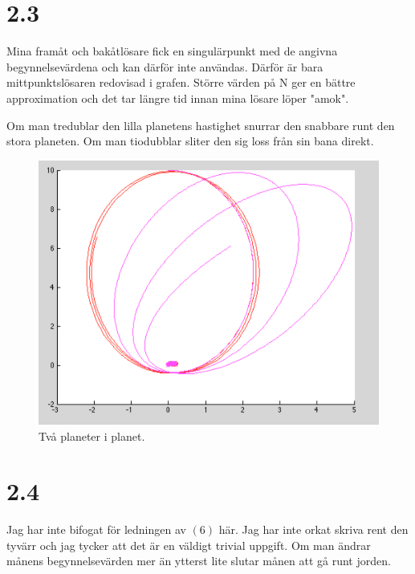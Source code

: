 \documentclass[a4paper,10pt]{article}
\begin{document}
    \section*{2.3}
    Mina framåt och bakåtlösare fick en singulärpunkt med de angivna begynnelsevärdena och kan därför inte användas. Därför är bara mittpunktslösaren redovisad i grafen. Större värden på N ger en bättre approximation och det tar längre tid innan mina lösare löper "amok".

    Om man tredublar den lilla planetens hastighet snurrar den snabbare runt den stora planeten. Om man tiodubblar sliter den sig loss från sin bana direkt.
    \begin{samepage}
    \end{samepage}
    \begin{samepage}
    \end{samepage}

    \begin{figure}
        \includegraphics[width=\textwidth]{celest2.png}
        \caption{Två planeter i planet.}
    \end{figure}

    \section*{2.4}
    Jag har inte bifogat för ledningen av $(6)$ här. Jag har inte orkat skriva rent den tyvärr och jag tycker att det är en väldigt trivial uppgift.
    Om man ändrar månens begynnelsevärden mer än ytterst lite slutar månen att gå runt jorden.
    \begin{samepage}
    \end{samepage}
    \begin{samepage}
    \end{samepage}
\end{document}

